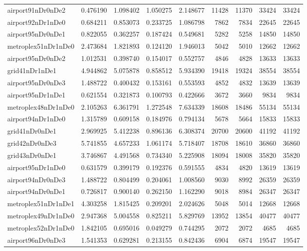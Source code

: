 \begin{longtable}{|l|r|r|r|r|r|r|r|r|}
airport91nDr0nDe2 & 0.476190 & 1.098402 & 1.050275 & 2.148677 & 11428 & 11370 & 33424 & 33424 \\
airport92nDr1nDe0 & 0.684211 & 0.853073 & 0.233725 & 1.086798 & 7862 & 7834 & 22645 & 22645 \\
airport95nDr0nDe1 & 0.822055 & 0.362257 & 0.187424 & 0.549681 & 5282 & 5258 & 14850 & 14850 \\
metroplex51nDr1nDe0 & 2.473684 & 1.821893 & 0.124120 & 1.946013 & 5042 & 5010 & 12662 & 12662 \\
airport95nDr0nDe2 & 1.012531 & 0.398740 & 0.154017 & 0.552757 & 4846 & 4828 & 13633 & 13633 \\
grid41nDr1nDe1 & 4.944862 & 5.075878 & 0.858512 & 5.934390 & 19418 & 19324 & 38554 & 38554 \\
airport95nDr0nDe3 & 1.488722 & 0.400432 & 0.153161 & 0.553593 & 4852 & 4832 & 13639 & 13639 \\
airport95nDr1nDe1 & 0.621554 & 0.321873 & 0.100793 & 0.422666 & 3672 & 3660 & 9834 & 9834 \\
metroplex48nDr1nDe0 & 2.105263 & 6.361791 & 1.272548 & 7.634339 & 18608 & 18486 & 55134 & 55134 \\
airport94nDr1nDe0 & 1.315789 & 0.609158 & 0.184976 & 0.794134 & 5678 & 5664 & 15833 & 15833 \\
grid41nDr0nDe1 & 2.969925 & 5.412238 & 0.896136 & 6.308374 & 20700 & 20600 & 41192 & 41192 \\
grid42nDr0nDe3 & 5.741855 & 4.657233 & 1.061174 & 5.718407 & 18708 & 18610 & 36860 & 36860 \\
grid43nDr0nDe1 & 3.746867 & 4.491568 & 0.734340 & 5.225908 & 18094 & 18008 & 35820 & 35820 \\
airport95nDr1nDe0 & 0.631579 & 0.399179 & 0.192376 & 0.591555 & 4834 & 4820 & 13619 & 13619 \\
airport94nDr0nDe3 & 1.488722 & 0.804499 & 0.204061 & 1.008560 & 9030 & 8992 & 26359 & 26359 \\
airport94nDr0nDe1 & 0.726817 & 0.900140 & 0.262150 & 1.162290 & 9018 & 8984 & 26347 & 26347 \\
metroplex51nDr1nDe1 & 4.303258 & 1.815425 & 0.209201 & 2.024626 & 5048 & 5014 & 12668 & 12668 \\
metroplex49nDr1nDe0 & 2.947368 & 5.004558 & 0.825211 & 5.829769 & 13952 & 13854 & 40477 & 40477 \\
metroplex52nDr1nDe0 & 1.842105 & 0.695016 & 0.049279 & 0.744295 & 2072 & 2072 & 4685 & 4685 \\
airport96nDr0nDe3 & 1.541353 & 0.629281 & 0.213155 & 0.842436 & 6904 & 6874 & 19547 & 19547 \\

\end{longtable}

